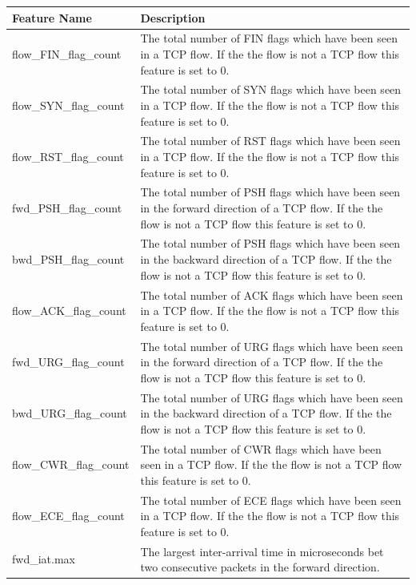 \documentclass[11pt]{article}
\begin{document}
\begin{table}
  \centering
  \begin{tabular}{|l|p{12cm}|}
    \hline
    Feature Name & Description \\
    \hline\hline
    flow\_FIN\_flag\_count & The total number of FIN flags which have been seen in a TCP flow. If the the flow is not a TCP flow this feature is set to 0. \\
    \hline
    flow\_SYN\_flag\_count & The total number of SYN flags which have been seen in a TCP flow. If the the flow is not a TCP flow this feature is set to 0. \\
    \hline
    flow\_RST\_flag\_count & The total number of RST flags which have been seen in a TCP flow. If the the flow is not a TCP flow this feature is set to 0. \\
    \hline
    fwd\_PSH\_flag\_count & The total number of PSH flags which have been seen in the forward direction of a TCP flow. If the the flow is not a TCP flow this feature is set to 0. \\
    \hline
    bwd\_PSH\_flag\_count & The total number of PSH flags which have been seen in the backward direction of a TCP flow. If the the flow is not a TCP flow this feature is set to 0. \\
    \hline
    flow\_ACK\_flag\_count & The total number of ACK flags which have been seen in a TCP flow. If the the flow is not a TCP flow this feature is set to 0. \\
    \hline
    fwd\_URG\_flag\_count & The total number of URG flags which have been seen in the forward direction of a TCP flow. If the the flow is not a TCP flow this feature is set to 0. \\
    \hline
    bwd\_URG\_flag\_count & The total number of URG flags which have been seen in the backward direction of a TCP flow. If the the flow is not a TCP flow this feature is set to 0. \\
    \hline
    flow\_CWR\_flag\_count & The total number of CWR flags which have been seen in a TCP flow. If the the flow is not a TCP flow this feature is set to 0. \\
    \hline
    flow\_ECE\_flag\_count & The total number of ECE flags which have been seen in a TCP flow. If the the flow is not a TCP flow this feature is set to 0. \\
    \hline
    fwd\_iat.max & The largest inter-arrival time in microseconds bet two consecutive packets in the forward direction. \\
    \hline

\end{tabular}
\end{table}
\end{document}

